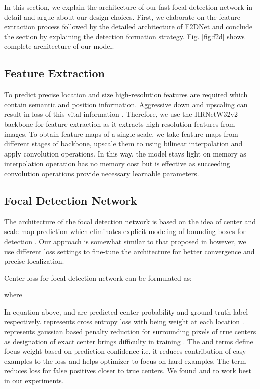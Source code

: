 \documentclass[a4paper,conference]{IEEEtran}
\begin{document}
In this section, we explain the architecture of our fast focal detection network in detail and argue about our design choices. First, we elaborate on the feature extraction process followed by the detailed architecture of F2DNet and conclude the section by explaining the detection formation strategy. Fig. \ref{fig:f2d} shows complete architecture of our model.

\subsection{Feature Extraction}
To predict precise location and size high-resolution features are required which contain semantic and position information. Aggressive down and upscaling can result in loss of this vital information \cite{pedestron}. Therefore, we use the HRNetW32v2 backbone \cite{hrnet} for feature extraction as it extracts high-resolution features from images.
To obtain feature maps of a single scale, we take feature maps from different stages of backbone, upscale them to  using bilinear interpolation and apply convolution operations. In this way, the model stays light on memory as interpolation operation has no memory cost but is effective as succeeding convolution operations provide necessary learnable parameters.

\subsection{Focal Detection Network}
The architecture of the focal detection network is based on the idea of center and scale map prediction which eliminates explicit modeling of bounding boxes for detection \cite{csp}. Our approach is somewhat similar to that proposed in \cite{csp} however, we use different loss settings to fine-tune the architecture for better convergence and precise localization.

Center loss for focal detection network can be formulated as: 



where



 In equation above,  and  are predicted center probability and ground truth label respectively.  represents cross entropy loss with  being weight at each location .  represents gaussian based penalty reduction for surrounding pixels of true centers as designation of exact center brings difficulty in training \cite{csp}. The  and  terms define focus weight based on prediction confidence i.e. it reduces contribution of easy examples to the loss and helps optimizer to focus on hard examples. The  term reduces loss for false positives closer to true centers. We found  and  to work best in our experiments.
\end{document}
